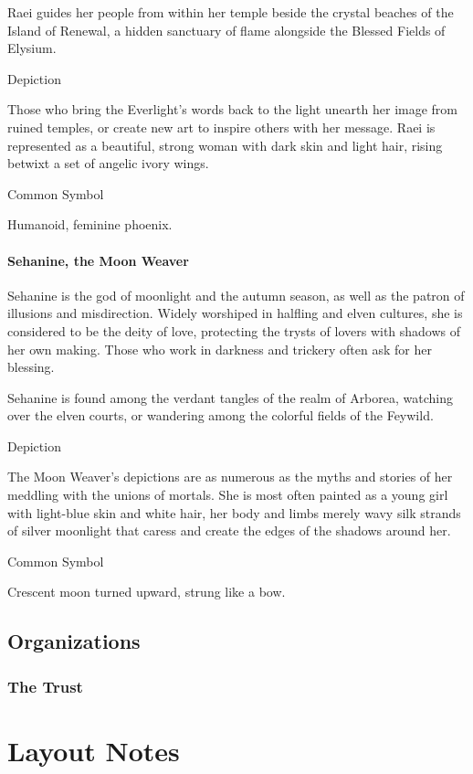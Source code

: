 \documentclass[letterpaper,twocolumn,openany,nodeprecatedcode]{dndbook}
\begin{document}
Raei guides her people from within her temple beside the crystal beaches of the Island of
Renewal, a hidden sanctuary of flame alongside the Blessed Fields of Elysium.

\subparagraph{Depiction}
Those who bring the Everlight’s words back to the light unearth her image from ruined temples,
or create new art to inspire others with her message. Raei is represented as a beautiful,
strong woman with dark skin and light hair, rising betwixt a set of angelic ivory wings.

\subparagraph{Common Symbol}
Humanoid, feminine phoenix.

\subsection{Sehanine, the Moon Weaver}

Sehanine is the god of moonlight and the autumn season, as well as the patron of illusions
and misdirection. Widely worshiped in halfling and elven cultures, she is considered to be
the deity of love, protecting the trysts of lovers with shadows of her own making. Those who
work in darkness and trickery often ask for her blessing.

Sehanine is found among the verdant tangles of the realm of Arborea, watching over the elven
courts, or wandering among the colorful fields of the Feywild.

\subparagraph{Depiction}
The Moon Weaver’s depictions are as numerous as the myths and stories of her meddling with
the unions of mortals. She is most often painted as a young girl with light-blue skin and
white hair, her body and limbs merely wavy silk strands of silver moonlight that caress and
create the edges of the shadows around her.

\subparagraph{Common Symbol}
Crescent moon turned upward, strung like a bow.

\chapter{Organizations}

\section{The Trust}

\part{Layout Notes}
\end{document}
